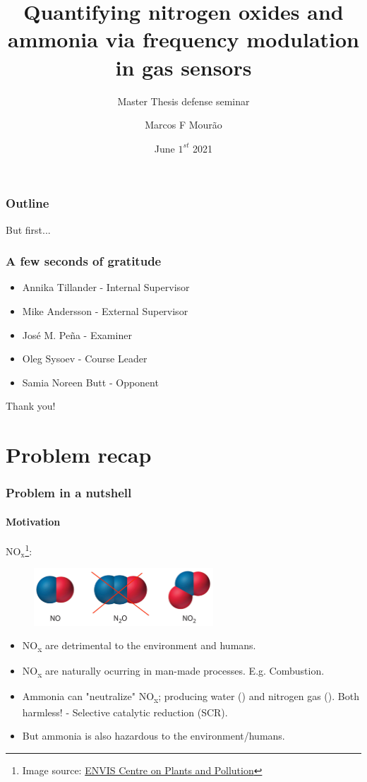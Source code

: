 \documentclass{beamer}
\title{Quantifying nitrogen oxides and ammonia via frequency modulation in gas sensors}
\subtitle{Master Thesis defense seminar}
\author{Marcos F Mourão}
\date{June $1^{st}$ 2021}
\newcommand{\nox}{\texorpdfstring{NO\textsubscript{x}}{NOx}\xspace}
\begin{document}
	\begin{frame}
		\titlepage
	\end{frame}

\begin{frame}
	\frametitle{Outline}
	\tableofcontents
\end{frame}

\begin{frame}
	\centering
	\Huge But first...
\end{frame}


\begin{frame}
	\frametitle{A few seconds of gratitude}
	\begin{itemize}
		\item Annika Tillander - Internal Supervisor
		\item Mike Andersson - External Supervisor
		\item José M. Peña - Examiner
		\item Oleg Sysoev - Course Leader
		\item Samia Noreen Butt - Opponent
	\end{itemize}
	\hspace{1cm}

	\centering
	\Huge Thank you!
	\end{frame}




\section{Problem recap}
\begin{frame}
	\frametitle{Problem in a nutshell}
	\framesubtitle{Motivation}
	
	\pause
	$\text{NO}_{\text{x}}$\footnote{Image source: \href{http://www.nbrienvis.nic.in/Database/1_2039.aspx}{ENVIS Centre on Plants and Pollution}}:
	\begin{figure}[!htb]
		\centering
		\includegraphics[width=0.6\textwidth]{../../figures/nox-molecules.jpg}
	\end{figure} 

	
	\begin{itemize}
		\pause
		\item \nox are detrimental to the environment and humans.
		
		\pause
		\item \nox  are naturally ocurring in man-made processes. E.g. Combustion.
		
		\pause
		\item Ammonia can "neutralize" \nox; producing water () and nitrogen gas (). Both harmless! - Selective catalytic reduction (SCR).
		
		\pause
		\item But ammonia is also hazardous to the environment/humans.
	\end{itemize}
	
\end{frame}
\end{document}
